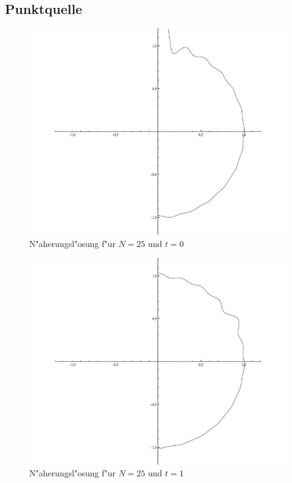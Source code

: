 \subsection{Punktquelle}
\begin{figure}
\begin{center}
\includegraphics[width=\hsize]{graphics/tsunami0}
\end{center}
\caption{N"aherungsl"osung f"ur $N=25$ und $t=0$\label{tsunami0}}
\end{figure}
\begin{figure}
\begin{center}
\includegraphics[width=\hsize]{graphics/tsunami50}
\end{center}
\caption{N"aherungsl"osung f"ur $N=25$ und $t=1$\label{tsunami50}}
\end{figure}

